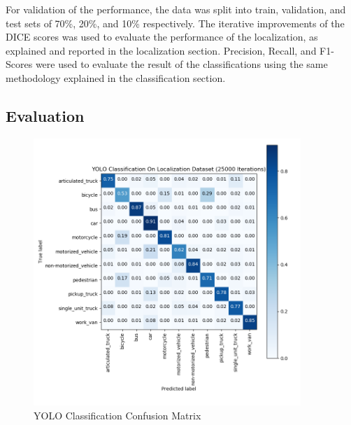 \documentclass[12pt]{article}
\begin{document}
For validation of the performance, the data was split into train, validation, and test sets of 70\%, 20\%, and 10\% respectively. The iterative improvements of the DICE scores was used to evaluate the performance of the localization, as explained and reported in the localization section. Precision, Recall, and F1-Scores were used to evaluate the result of the classifications using the same methodology explained in the classification section.

\subsection{Evaluation}

\begin{figure}[!htb]
    \centering
    \includegraphics[width=0.9\textwidth]{plots/confusion-yolo-25000.png}
    \caption{YOLO Classification Confusion Matrix}
    \label{fig:plots/confusion_5_log_reg}
\end{figure}
\end{document}

